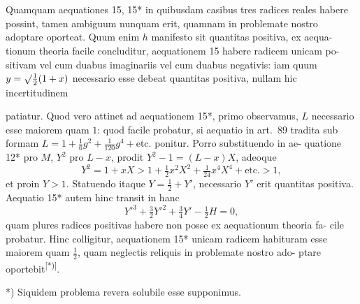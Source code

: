 \documentclass[12pt,a4paper]{article}
\begin{document}
\section{}

Quamquam aequationes 15, 15* in quibusdam casibus tres radices reales
habere possint, tamen ambiguum nunquam erit, quamnam in problemate nostro
adoptare oporteat. Quum enim $h$ manifesto sit quantitas positiva, ex aequa-
tionum theoria facile concluditur, aequationem 15 habere radicem unicam po-
sitivam vel cum duabus imaginariis vel cum duabus negativis: iam quum
$y = \surd\frac{1}{2}(1 + x)$ necessario esse debeat quantitas positiva, nullam hic incertitudinem

patiatur. Quod vero attinet ad aequationem 15*, primo observamus,
$L$ necessario esse maiorem quam $1$: quod facile probatur, si aequatio in art.~89
tradita sub formam $L = 1 + \tfrac{1}{6}g^2 + \tfrac{1}{120}g^4 + \text{etc.}$ ponitur. Porro substituendo in ae-
quatione 12* pro $M$, $Y^2$ pro $L - x$, prodit $Y^2 - 1 = (L - x)X$, adeoque
\[
Y^2 = 1 + xX > 1 + \tfrac{1}{2}x^2X^2 + \tfrac{1}{24}x^4X^4 + \text{etc.} > 1,
\]
et proin $Y > 1$. Statuendo itaque $Y = \tfrac{1}{2} + Y'$, necessario $Y'$ erit quantitas
positiva. Aequatio 15* autem hinc transit in hanc
\[
Y'^3 + \tfrac{3}{2}Y'^2 + \tfrac{3}{4}Y' - \tfrac{1}{2}H = 0,
\]
quam plures radices positivas habere non posse ex aequationum theoria fa-
cile probatur. Hinc colligitur, aequationem 15* unicam radicem habituram
esse maiorem quam $\tfrac{1}{2}$, quam neglectis reliquis in problemate nostro ado-
ptare oportebit\textsuperscript{[*)]}.

\begin{flushright}
\small\begin{minipage}{0.85\textwidth}
\raggedleft
*) Siquidem problema revera solubile esse supponimus.
\end{minipage}
\end{flushright}
\end{document}

